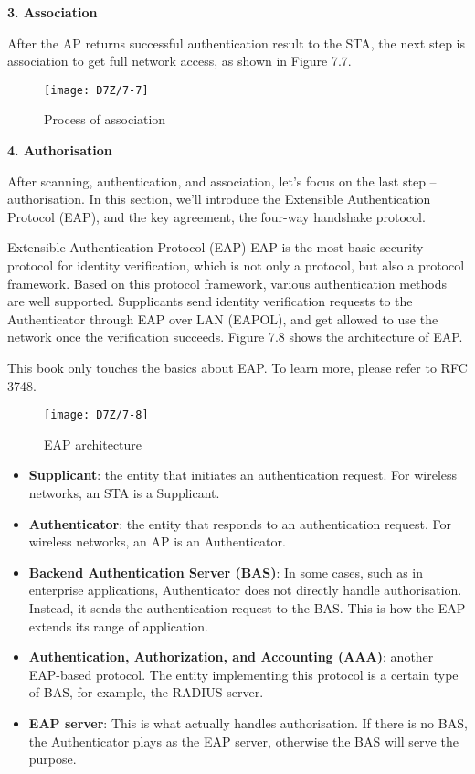 \documentclass[a4paper,12pt]{book}
\begin{document}
\textbf{3. Association}

After the AP returns successful authentication result to the STA, the next step is association to get full network access, as shown in Figure 7.7.

\begin{figure}[!h]
    \centering
    \texttt{[image: D7Z/7-7]}
    \caption{Process of association}
\end{figure}

\textbf{4. Authorisation}

After scanning, authentication, and association, let’s focus on the last step – authorisation. In this section, we’ll introduce the Extensible Authentication Protocol (EAP), and the key agreement, the four-way handshake protocol.

\begin{term}{Extensible Authentication Protocol (EAP)}
    EAP is the most basic security protocol for identity verification, which is not only a protocol, but also a protocol framework. Based on this protocol framework, various authentication methods are well supported. Supplicants send identity verification requests to the Authenticator through EAP over LAN (EAPOL), and get allowed to use the network once the verification succeeds. Figure 7.8 shows the architecture of EAP.
    
    \parskip 6pt
    This book only touches the basics about EAP. To learn more, please refer to RFC 3748.

    \begin{figure}[!h]
        \centering
        \texttt{[image: D7Z/7-8]}
        \caption{EAP architecture}
    \end{figure}

    \begin{itemize}
        \item \textbf{Supplicant}: the entity that initiates an authentication request. For wireless networks, an STA is a Supplicant.
        \item \textbf{Authenticator}: the entity that responds to an authentication request. For wireless networks, an AP is an Authenticator.
        \item \textbf{Backend Authentication Server (BAS)}: In some cases, such as in enterprise applications, Authenticator does not directly handle authorisation. Instead, it sends the authentication request to the BAS. This is how the EAP extends its range of application.
        \item \textbf{Authentication, Authorization, and Accounting (AAA)}: another EAP-based protocol. The entity implementing this protocol is a certain type of BAS, for example, the RADIUS server.
        \item \textbf{EAP server}: This is what actually handles authorisation. If there is no BAS, the Authenticator plays as the EAP server, otherwise the BAS will serve the purpose.
    \end{itemize}
\end{term}
\end{document}
